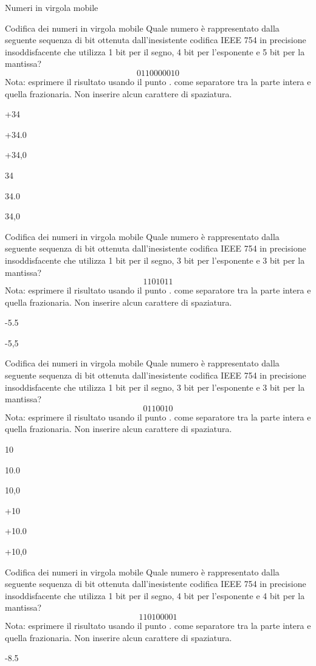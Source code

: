 \documentclass[11pt]{article}
\begin{document}
\begin{quiz}{Numeri in virgola mobile}
\begin{shortanswer}[points=1]{Codifica dei numeri in virgola mobile}
Quale numero \`{e} rappresentato dalla seguente sequenza di bit ottenuta dall'inesistente codifica IEEE 754 in precisione
insoddisfacente che utilizza 1 bit per il segno, 4 bit per l'esponente e 5 bit per la mantissa?
 $$ 0110000010 $$
Nota: esprimere il risultato usando il punto . come separatore tra la parte intera e quella frazionaria. Non inserire alcun carattere di spaziatura.
\item[] +34
\item[] +34.0
\item[] +34,0
\item[] 34
\item[] 34.0
\item[] 34,0
\end{shortanswer}



\begin{shortanswer}[points=1]{Codifica dei numeri in virgola mobile}
Quale numero \`{e} rappresentato dalla seguente sequenza di bit ottenuta dall'inesistente codifica IEEE 754 in precisione
insoddisfacente che utilizza 1 bit per il segno, 3 bit per l'esponente e 3 bit per la mantissa?
$$ 1101011 $$
Nota: esprimere il risultato usando il punto . come separatore tra la parte intera e quella frazionaria. Non inserire alcun carattere di spaziatura.
\item[] -5.5
\item[] -5,5
\end{shortanswer}

\begin{shortanswer}[points=1]{Codifica dei numeri in virgola mobile}
Quale numero \`{e} rappresentato dalla seguente sequenza di bit ottenuta dall'inesistente codifica IEEE 754 in precisione
insoddisfacente che utilizza 1 bit per il segno, 3 bit per l'esponente e 3 bit per la mantissa?
$$ 0110010 $$
Nota: esprimere il risultato usando il punto . come separatore tra la parte intera e quella frazionaria. Non inserire alcun carattere di spaziatura.
\item[] 10
\item[] 10.0
\item[] 10,0
\item[] +10
\item[] +10.0
\item[] +10,0
\end{shortanswer}


\begin{shortanswer}[points=1]{Codifica dei numeri in virgola mobile}
Quale numero \`{e} rappresentato dalla seguente sequenza di bit ottenuta dall'inesistente codifica IEEE 754 in precisione
insoddisfacente che utilizza 1 bit per il segno, 4 bit per l'esponente e 4 bit per la mantissa?
$$ 110100001 $$
Nota: esprimere il risultato usando il punto . come separatore tra la parte intera e quella frazionaria. Non inserire alcun carattere di spaziatura.
\item[] -8.5
\end{shortanswer}


\end{quiz}
\end{document}
